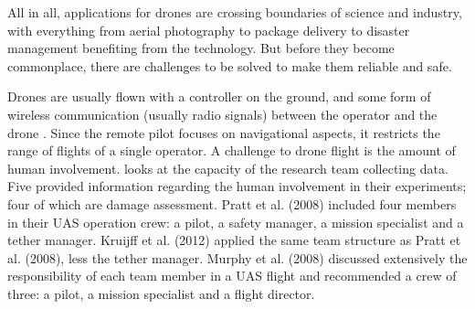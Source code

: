 


All in all, applications for drones are crossing boundaries of science and industry, with everything from aerial photography to package delivery to disaster management benefiting from the technology. But before they become commonplace, there are challenges to be solved to make them reliable and safe. 



Drones are usually flown with a controller on the ground, and some form of wireless communication (usually radio signals) between the operator and the drone  \cite{xiang_xia_zhang_2020}. Since the remote pilot focuses on navigational aspects, it restricts the range of flights of a single operator. A challenge to drone flight is the amount of human involvement. \cite{zhou_gheisari_2021} looks at the capacity of the research team collecting data. Five provided information regarding the human involvement in their experiments; four of which are damage assessment. Pratt et al. \cite{pratt_operator1} (2008) included four members in their UAS operation crew: a pilot, a safety manager, a mission specialist and a tether manager. Kruijff et al. (2012) \cite{Kruijff_operator2} applied the same team structure as Pratt et al. (2008), less the tether manager. Murphy et al. (2008) \cite{murphy_operator3} discussed extensively the responsibility of each team member in a UAS flight and recommended a crew of three: a pilot, a mission specialist and a flight director.

